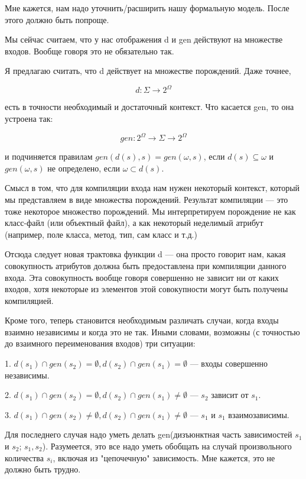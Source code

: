 


 Мне кажется, нам надо уточнить/расширить нашу формальную модель. После
этого должно быть попроще.

    Мы сейчас считаем, что у нас отображения d и gen действуют на множестве
входов. Вообще говоря это не обязательно так.

    Я предлагаю считать, что d действует на множестве порождений. Даже точнее,

    $$d : \Sigma\to 2^\Omega$$

    есть в точности необходимый и достаточный контекст. Что касается gen, то она
устроена так:

    $$gen : 2^\Omega\to\Sigma\to 2^\Omega$$

    и подчиняется правилам $gen(d(s),s)=gen(\omega,s)$, если $d(s)\subseteq\omega$ и
$gen(\omega,s)$ не определено, если $\omega\subset d(s)$.

    Смысл в том, что для компиляции входа нам нужен некоторый контекст, который
мы представляем в виде множества порождений. Результат компиляции --- это тоже
некоторое множество порождений. Мы интерпретируем порождение не как
класс-файл (или объектный файл), а как некоторый неделимый атрибут (например,
поле класса, метод, тип, сам класс и т.д.)

    Отсюда следует новая трактовка функции d --- она просто говорит нам, какая совокупность
атрибутов должна быть предоставлена при компиляции данного входа. Эта совокупность
вообще говоря совершенно не зависит ни от каких входов, хотя некоторые из элементов
этой совокупности могут быть получены компиляцией.

    Кроме того, теперь становится необходимым различать случаи, когда входы взаимно независимы
и когда это не так. Иными словами, возможны (с точностью до взаимного переименования входов)
три ситуации:

    1. $d(s_1)\cap gen(s_2) = \emptyset, d(s_2)\cap gen(s_1)=\emptyset$ --- входы совершенно независимы.
	
    2. $d(s_1)\cap gen(s_2) = \emptyset, d(s_2)\cap gen(s_1)\neq\emptyset$ --- $s_2$ зависит от $s_1$.
	
    3. $d(s_1)\cap gen(s_2)\neq\emptyset, d(s_2)\cap gen(s_1)\neq\emptyset$ --- $s_1$ и $s_1$ взаимозависимы.

    Для последнего случая надо уметь делать gen(дизъюнктная часть зависимостей $s_1$ и $s_2$; $s_1, s_2$).
    Разумеется, это все надо уметь обобщать на случай произвольного количества $s_i$, включая из
"цепочечную" зависимость. Мне кажется, это не должно быть трудно.

